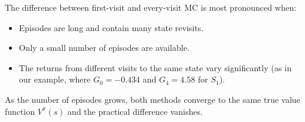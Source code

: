 \documentclass[journal, onecolumn]{IEEEtran}
\begin{document}
\begin{tcolorbox}[examplebox={When Does It Matter?}]
The difference between first-visit and every-visit MC is most pronounced when:
\begin{itemize}[leftmargin=1.5em, itemsep=2pt]
    \item Episodes are long and contain many state revisits.
    \item Only a small number of episodes are available.
    \item The returns from different visits to the same state vary significantly (as in our example, where $G_0 = -0.434$ and $G_4 = 4.58$ for $S_1$).
\end{itemize}
As the number of episodes grows, both methods converge to the same true value function $V^\pi(s)$ and the practical difference vanishes.
\end{tcolorbox}
\end{document}
